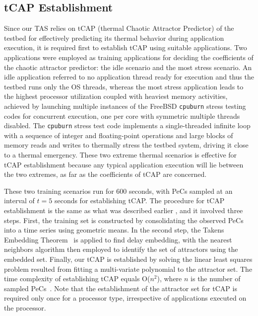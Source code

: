 \documentclass[times, 10pt,twocolumn]{IEEEtran}
\begin{document}
\subsection{tCAP Establishment}
\label{sec:callibration}
Since our TAS relies on tCAP (thermal Chaotic Attractor Predictor) of
the testbed for effectively predicting its thermal behavior during
application execution, it is required first to establish tCAP using
suitable applications.  Two applications were employed as training
applications for deciding the coefficients of the chaotic attractor
predictor: the idle scenario and the most stress scenario.  An idle
application referred to no application thread ready for execution and
thus the testbed runs only the OS threads, whereas the most stress
application leads to the highest processor utilization coupled with
heaviest memory activities, achieved by launching multiple instances of
the FreeBSD \texttt{cpuburn} stress testing codes for concurrent
execution, one per core with symmetric multiple threads disabled.  The
\texttt{cpuburn} stress test code implements a single-threaded infinite
loop with a sequence of integer and floating-point operations and large
blocks of memory reads and writes to thermally stress the testbed
system, driving it close to a thermal emergency.  These two extreme
thermal scenarios is effective for tCAP establishment because any
typical application execution will lie between the two extremes, as far
as the coefficients of tCAP are concerned.

These two training scenarios run for 600 seconds, with PeCs sampled at
an interval of $t=5$ seconds for establishing tCAP.  The procedure for
tCAP establishment is the same as what was described earlier
\cite{Lewis2010}, and it involved three steps. First, the training set
is constructed by consolidating the observed PeCs into a time series
using geometric means.  In the second step, the Takens Embedding
Theorem~\cite{Su2010} is applied to find delay embedding, with the
nearest neighbors algorithm then employed to identify the set of
attractors using the embedded set.  Finally, our tCAP is established by
solving the linear least squares problem resulted from fitting a
multi-variate polynomial to the attractor set.  The time complexity of
establishing tCAP equals O($n ^2$), where $n$ is the number of sampled
PeCs~\cite{Lewis2010}.  Note that the establishment of the attractor set
for tCAP is required only once for a processor type, irrespective of
applications executed on the processor.
\end{document}
